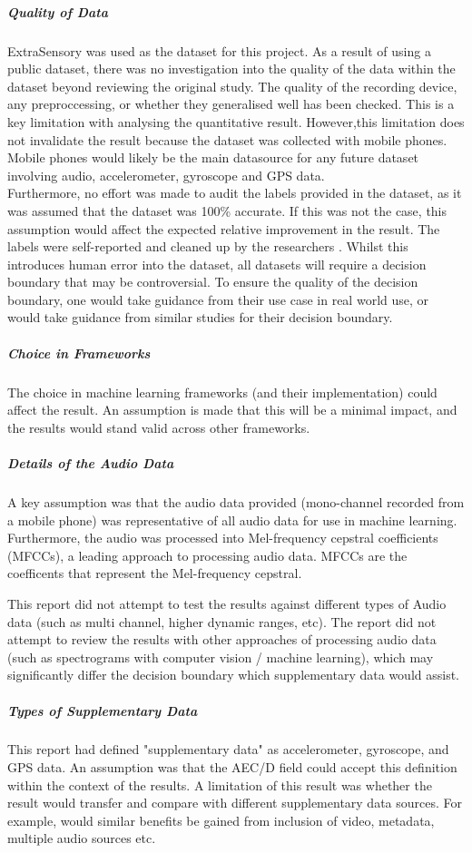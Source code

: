 \documentclass{UoNMCHA}
\numberwithin{equation}{section}
\begin{document}
\subparagraph{Quality of Data}
ExtraSensory was used as the dataset for this project. As a result of using a public dataset, there was no investigation into the quality of the data within the dataset beyond reviewing the original study. The quality of the recording device, any preproccessing, or whether they generalised well has been checked. This is a key limitation with analysing the quantitative result. However,this limitation does not invalidate the result because the dataset was collected with mobile phones. Mobile phones would likely be the main datasource for any future dataset involving audio, accelerometer, gyroscope and GPS data.\\

Furthermore, no effort was made to audit the labels provided in the dataset, as it was assumed that the dataset was 100\% accurate. If this was not the case, this assumption would affect the expected relative improvement in the result. The labels were self-reported and cleaned up by the researchers \cite{Vaizman2017}. Whilst this introduces human error into the dataset, all datasets will require a decision boundary that may be controversial. To ensure the quality of the decision boundary, one would take guidance from their use case in real world use, or would take guidance from similar studies for their decision boundary. 

\subparagraph{Choice in Frameworks}
The choice in machine learning frameworks (and their implementation) could affect the result. An assumption is made that this will be a minimal impact, and the results would stand valid across other frameworks.

\subparagraph{Details of the Audio Data}
A key assumption was that the audio data provided (mono-channel recorded from a mobile phone) was representative of all audio data for use in machine learning. Furthermore, the audio was processed into Mel-frequency cepstral coefficients (MFCCs), a leading approach to processing audio data. MFCCs are the coefficents that represent the Mel-frequency cepstral. 

This report did not attempt to test the results against different types of Audio data (such as multi channel, higher dynamic ranges, etc). The report did not attempt to review the results with other approaches of processing audio data (such as spectrograms with computer vision / machine learning), which may significantly differ the decision boundary which supplementary data would assist.

\subparagraph{Types of Supplementary Data}
This report had defined "supplementary data" as accelerometer, gyroscope, and GPS data. An assumption was that the AEC/D field could accept this definition within the context of the results. A limitation of this result was whether the result would transfer and compare with different supplementary data sources. For example, would similar benefits be gained from inclusion of video, metadata, multiple audio sources etc. 
\end{document}

